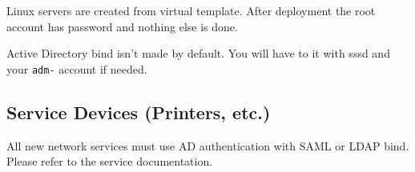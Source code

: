 \documentclass{demo}
\begin{document}
Linux servers are created from virtual template. After deployment the root account has password  and nothing else is done.

Active Directory bind isn't made by default. You will have to it with sssd and your \texttt{adm-} account if needed.

\subsection{Service Devices (Printers, etc.)}

All new network services must use AD authentication with SAML or LDAP bind. Please refer to the service documentation.
\end{document}
